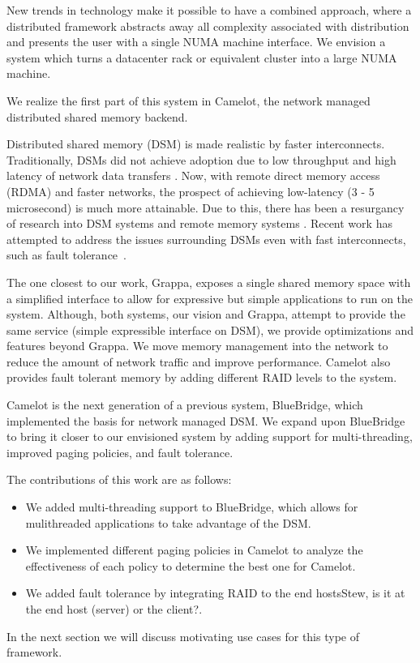 New trends in technology make it possible to have a combined approach, where a
distributed framework abstracts away all complexity associated with distribution
and presents the user with a single NUMA machine interface. We envision a system
which turns a datacenter rack or equivalent cluster into a large NUMA machine.

We realize the first part of this system in Camelot, the network managed
distributed shared memory backend. 

Distributed shared memory (DSM) is made realistic by faster interconnects.
Traditionally, DSMs did not achieve adoption due to low throughput and high
latency of network data transfers . Now, with remote direct memory
access (RDMA) and faster networks, the prospect of achieving low-latency (3 - 5
microsecond) is much more attainable. Due to this, there has been a resurgancy
of research into DSM systems and remote memory systems . Recent work
has attempted to address the issues surrounding DSMs even with fast
interconnects, such as fault tolerance~\cite{Ongaro2011,Nelson2015}.

The one closest to our work, Grappa, exposes a single shared memory space with
a simplified interface to allow for expressive but simple applications to run
on the system. Although, both systems, our vision and Grappa, attempt to provide
the same service (simple expressible interface on DSM), we provide optimizations
and features beyond Grappa. We move memory management into the network to reduce
the amount of network traffic and improve performance. Camelot also provides
fault tolerant memory by adding different RAID levels to the system. 

Camelot is the next generation of a previous system, BlueBridge, which
implemented the basis for network managed DSM. We expand upon BlueBridge to
bring it closer to our envisioned system by adding support for multi-threading,
improved paging policies, and fault tolerance.

The contributions of this work are as follows:
\begin{itemize}
	\item We added multi-threading support to BlueBridge, which allows for
	mulithreaded applications to take advantage of the DSM.
	\item We implemented different paging policies in Camelot to analyze the
	effectiveness of each policy to determine the best one for Camelot.
	\item We added fault tolerance by integrating RAID to the end hosts\ac{Stew,
	is it at the end host (server) or the client?}.
\end{itemize}

In the next section we will discuss motivating use cases for this type of
framework. 

